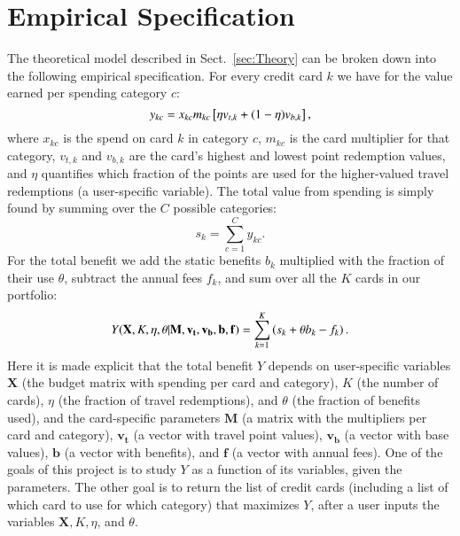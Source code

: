 \section{Empirical Specification} \label{sec:Specification}

The theoretical model described in Sect.~\ref{sec:Theory} can be broken down into the following empirical specification. For every credit card $k$ we have for the value earned per spending category $c$:
%
\begin{equation}
    y_{kc} = x_{kc}\/m_{kc} \left[ \eta\/ v_{t,k} + 
    (1 - \eta)\/ v_{b,k}\right],
\end{equation}
%
where $x_{kc}$ is the spend on card $k$ in category $c$, $m_{kc}$ is the card multiplier for that category, $v_{t,k}$ and $v_{b,k}$ are the card's highest and lowest point redemption values, and $\eta$ quantifies which fraction of the points are used for the higher-valued travel redemptions (a user-specific variable). The total value from spending is simply found by summing over the $C$ possible categories:
%
\begin{equation}
    s_{k} = \sum_{c=1}^{C}y_{kc}.
\end{equation}
%
For the total benefit we add the static benefits $b_{k}$ multiplied with the fraction of their use $\theta$, subtract the annual fees $f_{k}$, and sum over all the $K$ cards in our portfolio:
%
\begin{equation} \label{eq:specification}
    Y(\mathbf{X}, K, \eta, \theta | \mathbf{M}, \mathbf{v_{t}}, \mathbf{v_{b}}, \mathbf{b}, \mathbf{f} ) = \sum_{k=1}^{K}\left( s_{k} + \theta\/ b_{k} - f_{k}\right).
\end{equation}
%
Here it is made explicit that the total benefit $Y$ depends on user-specific variables $\mathbf{X}$ (the budget matrix with spending per card and category), $K$ (the number of cards), $\eta$ (the fraction of travel redemptions), and $\theta$ (the fraction of benefits used), and the card-specific parameters $\mathbf{M}$ (a matrix with the multipliers per card and category), $\mathbf{v_{t}}$ (a vector with travel point values), $\mathbf{v_{b}}$ (a vector with base values), $\mathbf{b}$ (a vector with benefits), and $\mathbf{f}$ (a vector with annual fees).
One of the goals of this project is to study $Y$ as a function of its variables, given the parameters.
The other goal is to return the list of credit cards (including a list of which card to use for which category) that maximizes $Y$, after a user inputs the variables $\mathbf{X}, K, \eta$, and $\theta$.